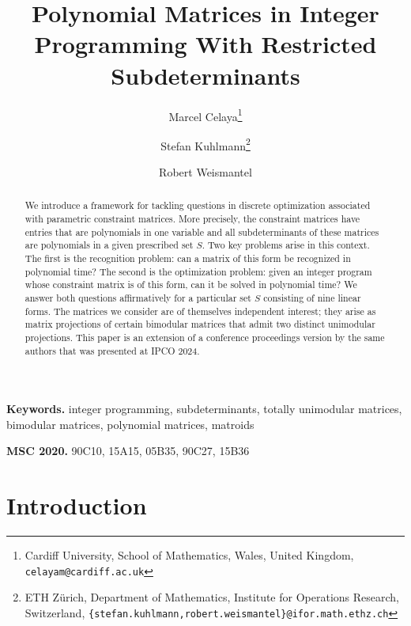 \documentclass[a4paper, 11pt]{article}
\author{Marcel Celaya\thanks{Cardiff University, School of Mathematics, Wales, United Kingdom, \texttt{celayam@cardiff.ac.uk}} \and Stefan Kuhlmann\thanks{ETH Zürich, Department of Mathematics, Institute for Operations Research, Switzerland, \texttt{\{stefan.kuhlmann,robert.weismantel\}@ifor.math.ethz.ch}} \and Robert Weismantel\footnotemark[2]}
\title{Polynomial Matrices in Integer Programming With Restricted Subdeterminants}
\date{ }
\begin{document}
	\maketitle

	\begin{abstract}
		We introduce a framework for tackling questions in discrete optimization associated with parametric constraint matrices. More precisely, the constraint matrices have entries that are polynomials in one variable and all subdeterminants of these matrices are polynomials in a given prescribed set $S$. 
        Two key problems arise in this context. The first is the recognition problem: can a matrix of this form be recognized in polynomial time? The second is the optimization problem: given an integer program whose constraint matrix is of this form, can it be solved in polynomial time? We answer both questions affirmatively for a particular set $S$ consisting of nine linear forms. The matrices we consider are of themselves independent interest; they arise as matrix projections of certain bimodular matrices that admit two distinct unimodular projections.	
		This paper is an extension of a conference proceedings version by the same authors that was presented at IPCO 2024.
	\end{abstract}

	\medskip
	\noindent\textbf{Keywords.} integer programming, subdeterminants, totally unimodular matrices, bimodular matrices, polynomial matrices, matroids

	\noindent\textbf{MSC 2020.} 90C10, 15A15, 05B35, 90C27, 15B36
	\medskip

	\section{Introduction}
	
\end{document}

